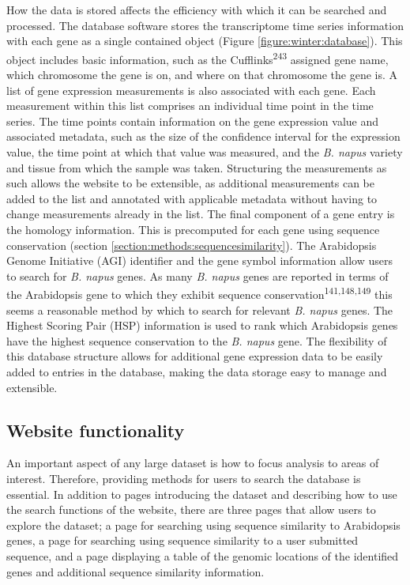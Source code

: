 \documentclass[12pt,]{book}
\begin{document}
How the data is stored affects the efficiency with which it can be
searched and processed. The database software stores the transcriptome
time series information with each gene as a single contained object
(Figure \ref{figure:winter:database}). This object includes basic
information, such as the Cufflinks\textsuperscript{243} assigned gene
name, which chromosome the gene is on, and where on that chromosome the
gene is. A list of gene expression measurements is also associated with
each gene. Each measurement within this list comprises an individual
time point in the time series. The time points contain information on
the gene expression value and associated metadata, such as the size of
the confidence interval for the expression value, the time point at
which that value was measured, and the \emph{B. napus} variety and
tissue from which the sample was taken. Structuring the measurements as
such allows the website to be extensible, as additional measurements can
be added to the list and annotated with applicable metadata without
having to change measurements already in the list. The final component
of a gene entry is the homology information. This is precomputed for
each gene using sequence conservation (section
\ref{section:methods:sequencesimilarity}). The Arabidopsis Genome
Initiative (AGI) identifier and the gene symbol information allow users
to search for \emph{B. napus} genes. As many \emph{B. napus} genes are
reported in terms of the Arabidopsis gene to which they exhibit sequence
conservation\textsuperscript{141,148,149} this seems a reasonable method
by which to search for relevant \emph{B. napus} genes. The Highest
Scoring Pair (HSP) information is used to rank which Arabidopsis genes
have the highest sequence conservation to the \emph{B. napus} gene. The
flexibility of this database structure allows for additional gene
expression data to be easily added to entries in the database, making
the data storage easy to manage and extensible.

\subsection{Website functionality}\label{website-functionality}

An important aspect of any large dataset is how to focus analysis to
areas of interest. Therefore, providing methods for users to search the
database is essential. In addition to pages introducing the dataset and
describing how to use the search functions of the website, there are
three pages that allow users to explore the dataset; a page for
searching using sequence similarity to Arabidopsis genes, a page for
searching using sequence similarity to a user submitted sequence, and a
page displaying a table of the genomic locations of the identified genes
and additional sequence similarity information.
\end{document}

